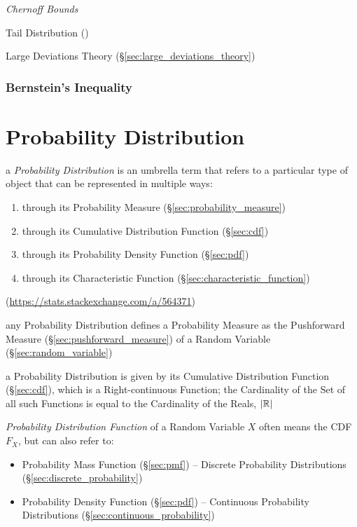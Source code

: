 \emph{Chernoff Bounds}

Tail Distribution (\label{sec:tail_distribution})

Large Deviations Theory (\S\ref{sec:large_deviations_theory})



\subsubsection{Bernstein's Inequality}\label{sec:bernsteins_inequality}



\section{Probability Distribution}\label{sec:probability_distribution}

a \emph{Probability Distribution} is an umbrella term that refers to a
particular type of object that can be represented in multiple ways:
\begin{enumerate}
  \item through its Probability Measure (\S\ref{sec:probability_measure})
  \item through its Cumulative Distribution Function (\S\ref{sec:cdf})
  \item through its Probability Density Function (\S\ref{sec:pdf})
  \item through its Characteristic Function
    (\S\ref{sec:characteristic_function})
\end{enumerate}
(\url{https://stats.stackexchange.com/a/564371})

any Probability Distribution defines a Probability Measure as the Pushforward
Measure (\S\ref{sec:pushforward_measure}) of a Random Variable
(\S\ref{sec:random_variable})

a Probability Distribution is given by its Cumulative Distribution Function
(\S\ref{sec:cdf}), which is a Right-continuous Function; the Cardinality of the
Set of all such Functions is equal to the Cardinality of the Reals, $|\mathbb{R}|$

\emph{Probability Distribution Function} of a Random Variable $X$ often means
the CDF $F_X$, but can also refer to:
\begin{itemize}
  \item Probability Mass Function (\S\ref{sec:pmf}) -- Discrete Probability
    Distributions (\S\ref{sec:discrete_probability})
  \item Probability Density Function (\S\ref{sec:pdf}) -- Continuous Probability
    Distributions (\S\ref{sec:continuous_probability})
\end{itemize}

